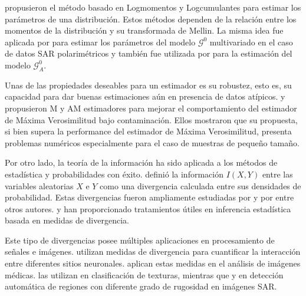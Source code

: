 \citet{nicolas2002} propusieron el método basado en Logmomentos y Logcumulantes para estimar los parámetros de una distribución. Estos métodos dependen de la relación entre los momentos de la distribución y su transformada de Mellin. La misma idea fue aplicada por \citet{khan2014} para estimar los parámetros del modelo $\mathcal{G}^0$ multivariado en el caso de datos SAR polarimétricos y también fue utilizada por \citet{Tison2004} para la estimación del modelo $\mathcal{G}^0_A$.

Unas de las propiedades deseables para un estimador es su robustez, esto es, su capacidad para dar buenas estimaciones aún en presencia de datos atípicos. \citet{BustosFreryLucini:Mestimators:2001} y \citet{AllendeFreryetal:JSCS:05} propusieron M y AM estimadores para mejorar el comportamiento del estimador de Máxima Verosimilitud bajo contaminación. Ellos mostraron que su propuesta, si bien supera la performance del estimador de Máxima Verosimilitud, presenta problemas numéricos especialmente para el caso de muestras de pequeño tamaño.

Por otro lado, la teoría de la información ha sido aplicada a los métodos de estadística y probabilidades con éxito. \citet{Shannon1948} definió la información $I(X,Y)$ entre las variables aleatorias $X$ e $Y$ como una divergencia calculada entre sus densidades de probabilidad. 
Estas divergencias fueron ampliamente estudiadas por \citet{KullbackLeibler1951} y por \citet{renyi1961} entre otros autores. \citet{pardo2005statistical} y \citet{Basu2011} han proporcionado tratamientos útiles en inferencia estadística basada en medidas de divergencia.

Este tipo de divergencias posee múltiples aplicaciones en procesamiento de señales e imágenes. 
\citet{Aviyente2007} utilizan medidas de divergencia para cuantificar la interacción entre diferentes sitios neuronales.
\citet{5599869} aplican estas medidas en el análisis de imágenes médicas.
\citet{1246862} las utilizan en clasificación de texturas, mientras que
\citet{6377288} y \citet{ClassificationPolSARSegmentsMinimizationWishartDistances} en detección automática de regiones con diferente grado de rugosidad en imágenes SAR.


